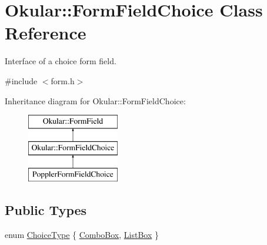 \hypertarget{classOkular_1_1FormFieldChoice}{\section{Okular\+:\+:Form\+Field\+Choice Class Reference}
\label{classOkular_1_1FormFieldChoice}
}


Interface of a choice form field.  




{\ttfamily \#include $<$form.\+h$>$}

Inheritance diagram for Okular\+:\+:Form\+Field\+Choice\+:\begin{figure}[H]
\begin{center}
\leavevmode
\includegraphics[height=3.000000cm]{classOkular_1_1FormFieldChoice}
\end{center}
\end{figure}
\subsection*{Public Types}
\begin{DoxyCompactItemize}
\item 
enum \hyperlink{classOkular_1_1FormFieldChoice_a40b3939793e805c34303dff8262a17b3}{Choice\+Type} \{ \hyperlink{classOkular_1_1FormFieldChoice_a40b3939793e805c34303dff8262a17b3a0b28a631de109efed14e9183a83a0855}{Combo\+Box}, 
\hyperlink{classOkular_1_1FormFieldChoice_a40b3939793e805c34303dff8262a17b3acc508b1d796fa6a7da5043fdbf6c7d2a}{List\+Box}
 \}
\end{DoxyCompactItemize}
